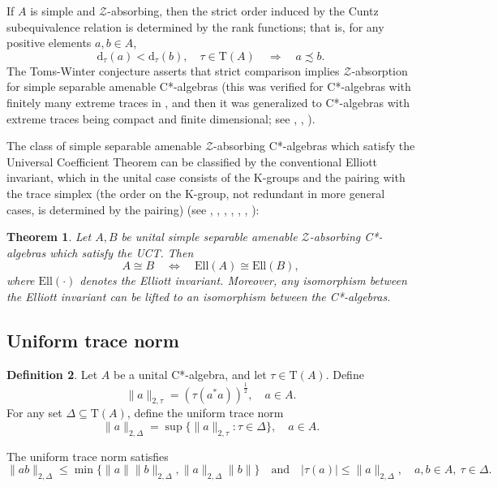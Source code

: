 \documentclass[12pt, oneside, psamsfonts]{amsart}
\newtheorem{thm}{Theorem}[section]
\theoremstyle{definition}
\newtheorem{defn}[thm]{Definition}
\theoremstyle{remark}
\numberwithin{equation}{section}
\newcommand{\norm}[1]{\| #1\|}
\newcommand{\abs}[1]{| #1 |}
\newcommand{\tr}{\mathrm{T}}
\begin{document}
If $A$ is simple and $\mathcal Z$-absorbing, then the strict order induced by the Cuntz subequivalence relation is determined by the rank functions; that is, for any positive elements $a, b \in A$,
$$ \mathrm{d}_\tau(a) < \mathrm{d}_\tau(b),\quad \tau \in \tr(A) \quad \Longrightarrow \quad  a \precsim b.  $$
The Toms-Winter conjecture asserts that strict comparison implies $\mathcal Z$-absorption for simple separable amenable C*-algebras (this was verified for C*-algebras with finitely many extreme traces in \cite{Matui-Sato-CP}, and then it was generalized to C*-algebras with extreme traces being compact and finite dimensional; see \cite{Sato-CP}, \cite{KR-CenSeq}, \cite{TWW-Z}).

The class of simple separable amenable $\mathcal Z$-absorbing C*-algebras which satisfy the Universal Coefficient Theorem can be classified by the conventional Elliott invariant, which in the unital case consists of the K-groups and the pairing with the trace simplex (the order on the K-group, not redundant in more general cases, is determined by the pairing) (see \cite{GLN-TAS-1}, \cite{GLN-TAS-2}, \cite{EN-K0-Z}, \cite{EGLN-DR}, \cite{EGLN-ASH}, \cite{TWW-QD}, \cite{CETWW-dim-n}):
\begin{thm}\label{classification-Z}
Let $A, B$ be unital simple separable amenable $\mathcal Z$-absorbing C*-algebras which satisfy the UCT. Then $$ A \cong B \quad \Longleftrightarrow \quad \mathrm{Ell}(A) \cong \mathrm{Ell}(B), $$ where $\mathrm{Ell}(\cdot)$ denotes the Elliott invariant. Moreover, any isomorphism between the Elliott invariant can be lifted to an isomorphism between the C*-algebras.
\end{thm}

\subsection{Uniform trace norm}

\begin{defn}
Let $A$ be a unital C*-algebra, and let $\tau \in \tr(A)$. Define
$$  \norm{a}_{2, \tau} = (\tau(a^*a))^{\frac{1}{2}}, \quad a \in A.$$
For any set $\Delta \subseteq \tr(A)$,  define the uniform trace norm
$$ \norm{a}_{2, \Delta} = \sup\{ \norm{a}_{2, \tau}: \tau \in \Delta\},\quad a \in A.$$
\end{defn}
The uniform trace norm satisfies
$$ \norm{ab}_{2, \Delta} \leq \min\{ \norm{a} \norm{b}_{2, \Delta}, \norm{a}_{2, \Delta} \norm{b}\} \quad \mathrm{and}\quad \abs{\tau(a)} \leq \norm{a}_{2, \Delta},\quad  a, b \in A,\ \tau \in \Delta.$$ %
\end{document}
